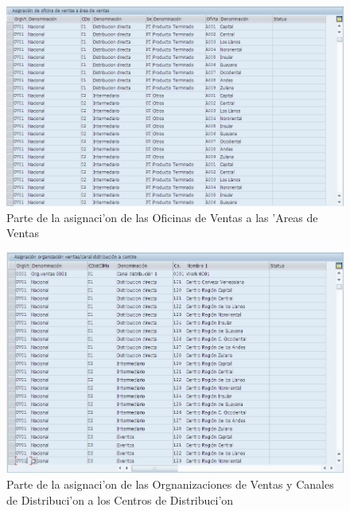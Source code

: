 \begin{figure}[htb]
\centering
\includegraphics[scale=0.65,type=jpg,ext=.jpg,read=.jpg]{figures/OfVentaAreas}
\caption{Parte de la asignaci'on de las Oficinas de Ventas a las 'Areas de Ventas}
\label{fig:asigna4}
\end{figure}
\begin{figure}[htb]
\centering
\includegraphics[scale=0.65,type=jpg,ext=.jpg,read=.jpg]{figures/OrgCanalCentro}
\caption{Parte de la asignaci'on de las Orgnanizaciones de Ventas y Canales de Distribuci'on a los Centros de Distribuci'on}
\label{fig:asigna5}
\end{figure}
